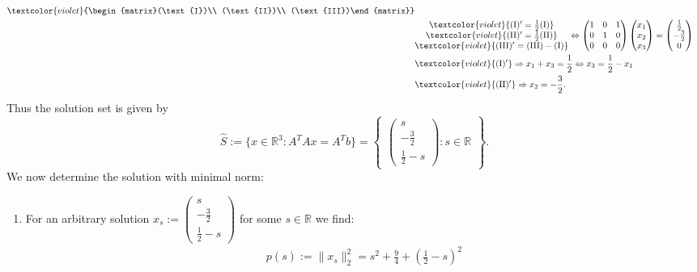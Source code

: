 {\begin{enumerate}
\begin{align*}
	\textcolor{violet}{\begin{matrix}(\text{I})\\ (\text{II})\\ (\text{III})\end{matrix}}\\&\begin{matrix}\textcolor{violet}{(\text{I})'
	=\frac{1}{2}(\text{I})}\\ \textcolor{violet}{(\text{II})'=\frac{1}{2}(\text{II})}\\ \textcolor{violet}{(\text{III})'=(\text{III})-(\text{I})}\end{matrix} \Leftrightarrow
	\begin{pmatrix}1&0&1\\0&1&0\\0&0&0\end{pmatrix}
	\begin{pmatrix}x_1\\x_2\\x_3\end{pmatrix}
	=\begin{pmatrix}\frac{1}{2}\\ -\frac{3}{2}\\0\end{pmatrix}\\
	&\textcolor{violet}{(\text{I})'}\Rightarrow x_1+x_3=\frac{1}{2}\Leftrightarrow x_3=\frac{1}{2}-x_1\\
	& \textcolor{violet}{(\text{II})'}\Rightarrow x_2=-\frac{3}{2}.
	\end{align*}
	Thus the solution set is given by 
	$$
	\hat{S}:=\{x\in\mathbb{R}^3:A^TAx=A^Tb\}=\begin{Bmatrix}\begin{pmatrix}s\\-\frac{3}{2}\\\frac{1}{2}-s\end{pmatrix}:s\in\mathbb{R}\end{Bmatrix}.
	$$
	We now determine the solution with minimal norm:
	\begin{enumerate}
		\item 
		For an arbitrary solution $x_s:=\begin{pmatrix}s\\-\frac{3}{2}\\\frac{1}{2}-s\end{pmatrix}$ for some $s\in\mathbb{R}$ we find: 
		\begin{align*} p(s):= \|{x_s}\|_2^2 =s^2+\frac{9}{4}+\left(\frac{1}{2}-s\right)^2

\end{align*}
\end{enumerate}
\end{enumerate}}
